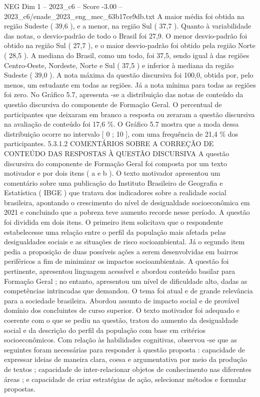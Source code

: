 \begin{textsample}{NEG Dim 1 – 2023\_c6 – Score -3.00 – 2023\_c6/enade\_2023\_eng\_mec\_63b17ce9db.txt}
A maior média foi obtida na região Sudeste ( 39,6 ), e a menor, na região Sul ( 37,7 ).
Quanto à variabilidade das notas, o desvio-padrão de todo o Brasil foi 27,9.
O menor desvio-padrão foi obtido na região Sul ( 27,7 ), e o maior desvio-padrão foi obtido pela região Norte ( 28,5 ).
A mediana do Brasil, como um todo, foi 37,5, sendo igual à das regiões Centro-Oeste, Nordeste, Norte e Sul ( 37,5 ) e inferior à mediana da região Sudeste ( 39,0 ).
A nota máxima da questão discursiva foi 100,0, obtida por, pelo menos, um estudante em todas as regiões.
Já a nota mínima para todas as regiões foi zero.
No Gráfico 5.7, apresenta -se a distribuição das notas de conteúdo da questão discursiva do componente de Formação Geral.
O percentual de participantes que deixaram em branco a resposta ou zeraram a questão discursiva na avaliação de conteúdo foi 17,6 \%.
O Gráfico 5.7 mostra que a moda dessa distribuição ocorre no intervalo [ 0 ; 10 ], com uma frequência de 21,4 \% dos participantes. 5.3.1.2 COMENTÁRIOS SOBRE A CORREÇÃO DE CONTEÚDO DAS RESPOSTAS À QUESTÃO DISCURSIVA A questão discursiva do componente de Formação Geral foi composta por um texto motivador e por dois itens ( a e b ).
O texto motivador apresentou um comentário sobre uma publicação do Instituto Brasileiro de Geografia e Estatística ( IBGE ) que tratava dos indicadores sobre a realidade social brasileira, apontando o crescimento do nível de desigualdade socioeconômica em 2021 e concluindo que a pobreza teve aumento recorde nesse período.
A questão foi dividida em dois itens.
O primeiro item solicitava que o respondente estabelecesse uma relação entre o perfil da população mais afetada pelas desigualdades sociais e as situações de risco socioambiental.
Já o segundo item pedia a proposição de duas possíveis ações a serem desenvolvidas em bairros periféricos a fim de minimizar os impactos socioambientais.
A questão foi pertinente, apresentou linguagem acessível e abordou conteúdo basilar para Formação Geral ; no entanto, apresentou um nível de dificuldade alto, dadas as competências intrincadas que demandou.
O tema foi atual e de grande relevância para a sociedade brasileira.
Abordou assunto de impacto social e de provável domínio dos concluintes de curso superior.
O texto motivador foi adequado e coerente com o que se pediu na questão, tratou do aumento da desigualdade social e da descrição do perfil da população com base em critérios socioeconômicos.
Com relação às habilidades cognitivas, observou -se que as seguintes foram necessárias para responder à questão proposta : capacidade de expressar ideias de maneira clara, coesa e argumentativa por meio da produção de textos ; capacidade de inter-relacionar objetos de conhecimento nas diferentes áreas ; e capacidade de criar estratégias de ação, selecionar métodos e formular propostas.

\end{textsample}
